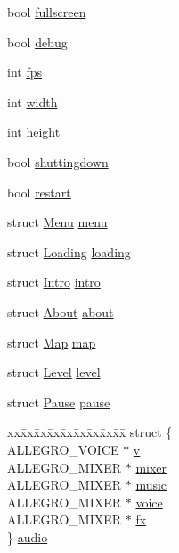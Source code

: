 \begin{DoxyCompactItemize}
\item 
bool \hyperlink{structGame_a026034417d95688ab99ba2e96e064b7f}{fullscreen}
\item 
bool \hyperlink{structGame_ad1a3eb5c2d99f8cb9c1f7eb91689af6d}{debug}
\item 
int \hyperlink{structGame_a28534ff51b7b2adc76bdd8894a750d0d}{fps}
\item 
int \hyperlink{structGame_a06b5a675d7c0f6a9b58d395872b1a4e7}{width}
\item 
int \hyperlink{structGame_aa6d1743c45de5558a0ca99078df85250}{height}
\item 
bool \hyperlink{structGame_a9a1d33be7ec00f87ede16b96bd2df312}{shuttingdown}
\item 
bool \hyperlink{structGame_aad2035c807bd99529d1a07e443e0016b}{restart}
\item 
struct \hyperlink{structMenu}{Menu} \hyperlink{structGame_ad120de2e84e2d857dd83fc1116176f21}{menu}
\item 
struct \hyperlink{structLoading}{Loading} \hyperlink{structGame_a496f71737460d24add0f426f7fbc90b9}{loading}
\item 
struct \hyperlink{structIntro}{Intro} \hyperlink{structGame_afcc0b09f19df8162100973a002509000}{intro}
\item 
struct \hyperlink{structAbout}{About} \hyperlink{structGame_a0f7f35de759c984c4b53c86fb0dcbd44}{about}
\item 
struct \hyperlink{structMap}{Map} \hyperlink{structGame_aaab875b9e556df53251db40341046cab}{map}
\item 
struct \hyperlink{structLevel}{Level} \hyperlink{structGame_aa258068886c6db9c88d73e07c7e114f2}{level}
\item 
struct \hyperlink{structPause}{Pause} \hyperlink{structGame_a3fe420d2d9b47cbdbb26d4f68bb5a0f0}{pause}
\item 
\begin{tabbing}
xx\=xx\=xx\=xx\=xx\=xx\=xx\=xx\=xx\=\kill
struct \{\\
\>ALLEGRO\_VOICE $\ast$ \hyperlink{structGame_ab27cb95bcd1591fec45317a1e9f5062d}{v}\\
\>ALLEGRO\_MIXER $\ast$ \hyperlink{structGame_ab8265074be4df5408a7c2fc1fb89dfc4}{mixer}\\
\>ALLEGRO\_MIXER $\ast$ \hyperlink{structGame_a49891173b349e56fcda6b0a0e39a47ee}{music}\\
\>ALLEGRO\_MIXER $\ast$ \hyperlink{structGame_acc651129cb9fafedf0588e229827c543}{voice}\\
\>ALLEGRO\_MIXER $\ast$ \hyperlink{structGame_adb4702bfcc1973de315ead6d683331b2}{fx}\\
\} \hyperlink{structGame_a08fa0fd8226d1c661bbdd069197fb690}{audio}\\

\end{tabbing}\end{DoxyCompactItemize}


